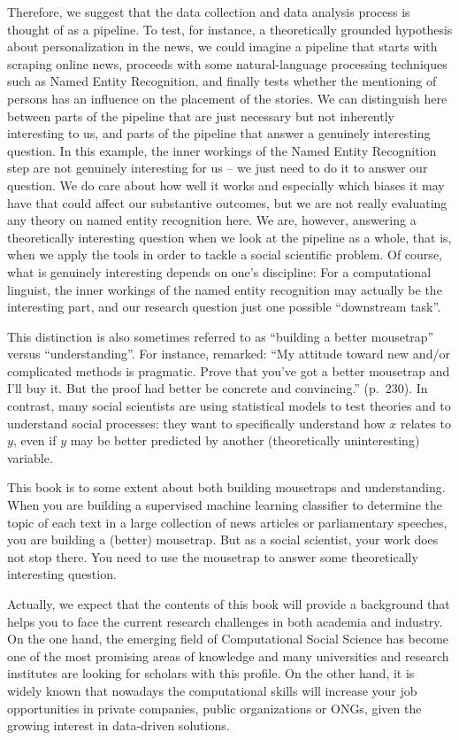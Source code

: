 Therefore, we suggest that the data collection and data
analysis process is thought of as a pipeline. To test, for instance, a theoretically
grounded hypothesis about personalization in the news, we could
imagine a pipeline that starts with scraping online news, proceeds
with some natural-language processing techniques such as Named Entity
Recognition, and finally tests whether the mentioning of persons has
an influence on the placement of the stories. We can distinguish here
between parts of the pipeline that are just necessary but not
inherently interesting to us, and parts of the pipeline that answer a
genuinely interesting question. In this example, the inner workings of
the Named Entity Recognition step are not genuinely interesting for us
-- we just need to do it to answer our question.
We do care about how well it works and especially which biases it may have that could affect our substantive outcomes,
but we are not really evaluating any theory on named entity recognition here.
We are, however, answering a theoretically
interesting question when we look at the pipeline as a whole,
that is, when we apply the tools in order to tackle a social scientific problem. 
Of course, what is genuinely interesting depends on one's discipline: For a
computational linguist, the inner workings of the named entity recognition
may actually be the interesting part, and our research question just one
possible ``downstream task''.

This distinction is also sometimes referred to as ``building a better
mousetrap'' versus ``understanding''. For instance, \cite{Breiman2001}
remarked: ``My attitude toward new and/or complicated methods is
pragmatic. Prove that you've got a better mousetrap and I'll buy
it. But the proof had better be concrete and convincing.''
(p.~230).
In contrast, many social scientists are using statistical
models to test theories and to understand social processes: they want
to specifically understand how $x$ relates to $y$, even if $y$ may be better
predicted by another (theoretically uninteresting) variable.

This book is to some extent about both building mousetraps and understanding. When you
are building a supervised machine learning classifier to determine the
topic of each text in a large collection of news articles or
parliamentary speeches, you are building a (better) mousetrap. But as
a social scientist, your work does not stop there. You need to use
the mousetrap to answer some theoretically interesting question.

Actually, we expect that the contents of this book will provide a background that helps you to face the current research challenges in both academia and industry. On the one hand, the emerging field of Computational Social Science has become one of the most promising areas of knowledge and many universities and research institutes are looking for scholars with this profile.  On the other hand, it is widely known that nowadays the computational skills will increase your job opportunities in private companies, public organizations or ONGs, given the growing interest in data-driven solutions.

